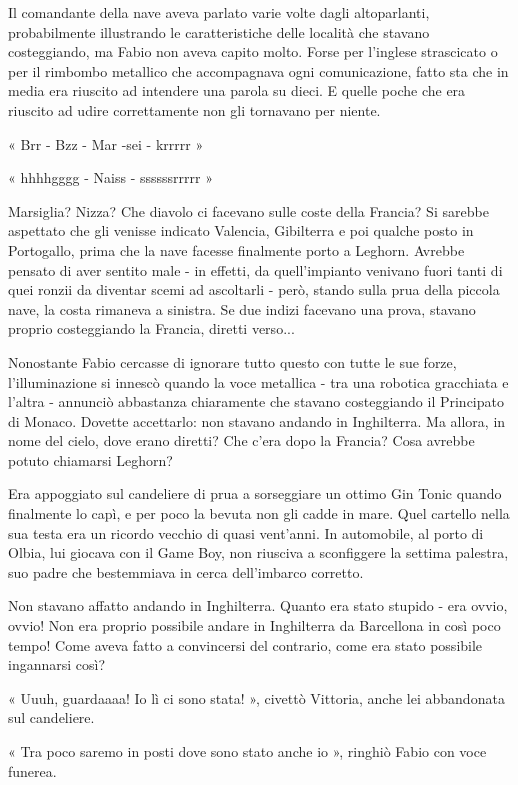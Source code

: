 Il comandante della nave aveva parlato varie volte dagli altoparlanti, probabilmente illustrando le caratteristiche delle località che stavano costeggiando, ma Fabio non aveva capito molto. Forse per l'inglese strascicato o per il rimbombo metallico che accompagnava ogni comunicazione, fatto sta che in media era riuscito ad intendere una parola su dieci. E quelle poche che era riuscito ad udire correttamente non gli tornavano per niente.

« Brr - Bzz - Mar -sei - krrrrr »

« hhhhgggg - Naiss - ssssssrrrrr »

Marsiglia? Nizza? Che diavolo ci facevano sulle coste della Francia? Si sarebbe aspettato che gli venisse indicato Valencia, Gibilterra e poi qualche posto in Portogallo, prima che la nave facesse finalmente porto a Leghorn. Avrebbe pensato di aver sentito male - in effetti, da quell'impianto venivano fuori tanti di quei ronzii da diventar scemi ad ascoltarli - però, stando sulla prua della piccola nave, la costa rimaneva a sinistra. Se due indizi facevano una prova, stavano proprio costeggiando la Francia, diretti verso...

Nonostante Fabio cercasse di ignorare tutto questo con tutte le sue forze, l'illuminazione si innescò quando la voce metallica - tra una robotica gracchiata e l'altra - annunciò abbastanza chiaramente che stavano costeggiando il Principato di Monaco. Dovette accettarlo: non stavano andando in Inghilterra. Ma allora, in nome del cielo, dove erano diretti? Che c'era dopo la Francia? Cosa avrebbe potuto chiamarsi Leghorn?

Era appoggiato sul candeliere di prua a sorseggiare un ottimo Gin Tonic quando finalmente lo capì, e per poco la bevuta non gli cadde in mare. Quel cartello nella sua testa era un ricordo vecchio di quasi vent'anni. In automobile, al porto di Olbia, lui giocava con il Game Boy, non riusciva a sconfiggere la settima palestra, suo padre che bestemmiava in cerca dell'imbarco corretto.

Non stavano affatto andando in Inghilterra. Quanto era stato stupido - era ovvio, ovvio! Non era proprio possibile andare in Inghilterra da Barcellona in così poco tempo! Come aveva fatto a convincersi del contrario, come era stato possibile ingannarsi così?

« Uuuh, guardaaaa! Io lì ci sono stata! », civettò Vittoria, anche lei abbandonata sul candeliere.

« Tra poco saremo in posti dove sono stato anche io », ringhiò Fabio con voce funerea.

